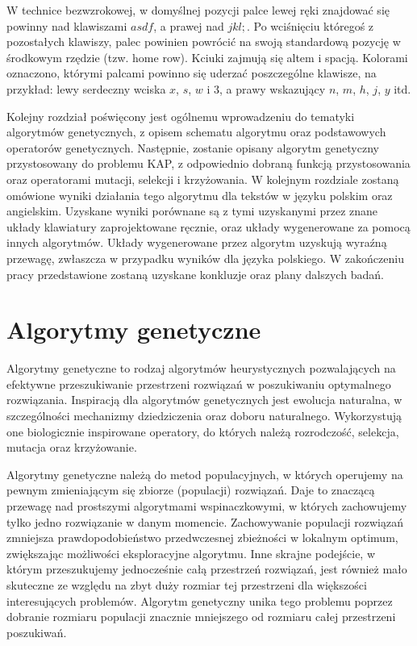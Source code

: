 \documentclass[brudnopis]{xmgr}
\begin{document}
W technice bezwzrokowej, w domyślnej pozycji palce lewej ręki znajdować się powinny nad klawiszami $asdf$, a prawej nad $jkl;$. Po wciśnięciu któregoś z pozostałych klawiszy, palec powinien powrócić na swoją standardową pozycję w środkowym rzędzie (tzw. home row). Kciuki zajmują się altem i spacją. Kolorami oznaczono, którymi palcami powinno się uderzać poszczególne klawisze, na przykład: lewy serdeczny wciska $x$, $s$, $w$ i $3$, a prawy wskazujący $n$, $m$, $h$, $j$, $y$ itd.

Kolejny rozdział poświęcony jest ogólnemu wprowadzeniu do tematyki algorytmów genetycznych, z opisem schematu algorytmu oraz podstawowych operatorów genetycznych. Następnie, zostanie opisany algorytm genetyczny przystosowany do problemu KAP, z odpowiednio dobraną funkcją przystosowania oraz operatorami mutacji, selekcji i krzyżowania. W kolejnym rozdziale zostaną omówione wyniki działania tego algorytmu dla tekstów w języku polskim oraz angielskim. Uzyskane wyniki porównane są z tymi uzyskanymi przez znane układy klawiatury zaprojektowane ręcznie, oraz układy wygenerowane za pomocą innych algorytmów. Układy wygenerowane przez algorytm uzyskują wyraźną przewagę, zwłaszcza w przypadku wyników dla języka polskiego. W zakończeniu pracy przedstawione zostaną uzyskane konkluzje oraz plany dalszych badań.


\chapter{Algorytmy genetyczne}

Algorytmy genetyczne to rodzaj algorytmów heurystycznych pozwalających na efektywne przeszukiwanie przestrzeni rozwiązań w poszukiwaniu optymalnego rozwiązania. Inspiracją dla algorytmów genetycznych jest ewolucja naturalna, w szczególności mechanizmy dziedziczenia oraz doboru naturalnego. Wykorzystują one biologicznie inspirowane operatory, do których należą rozrodczość, selekcja, mutacja oraz krzyżowanie.

Algorytmy genetyczne należą do metod populacyjnych, w których operujemy na pewnym zmieniającym się zbiorze (populacji) rozwiązań. Daje to znaczącą przewagę nad prostszymi algorytmami wspinaczkowymi, w których zachowujemy tylko jedno rozwiązanie w danym momencie. Zachowywanie populacji rozwiązań zmniejsza prawdopodobieństwo przedwczesnej zbieżności w lokalnym optimum, zwiększając możliwości eksploracyjne algorytmu. Inne skrajne podejście, w którym przeszukujemy jednocześnie całą przestrzeń rozwiązań, jest również mało skuteczne ze względu na zbyt duży rozmiar tej przestrzeni dla większości interesujących problemów. Algorytm genetyczny unika tego problemu poprzez dobranie rozmiaru populacji znacznie mniejszego od rozmiaru całej przestrzeni poszukiwań.
\end{document}
